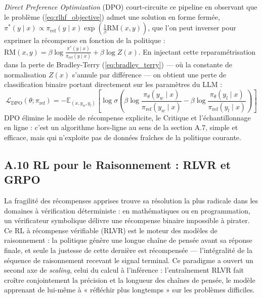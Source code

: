 \documentclass[11pt,a4paper]{article}
\begin{document}
\emph{Direct Preference Optimization} (DPO) \cite{rafailov2024direct} court-circuite ce pipeline en observant que le problème (\ref{eq:rlhf_objective}) admet une solution en forme fermée, $\pi^*(y \mid x) \propto \pi_{\text{ref}}(y \mid x) \exp(\frac{1}{\beta}\text{RM}(x,y))$, que l'on peut inverser pour exprimer la récompense en fonction de la politique : $\text{RM}(x, y) = \beta \log \frac{\pi^*(y \mid x)}{\pi_{\text{ref}}(y \mid x)} + \beta \log Z(x)$. En injectant cette reparamétrisation dans la perte de Bradley-Terry (\ref{eq:bradley_terry}) — où la constante de normalisation $Z(x)$ s'annule par différence — on obtient une perte de classification binaire portant directement sur les paramètres du LLM :
\begin{equation}
\mathcal{L}_{\text{DPO}}(\theta; \pi_{\text{ref}}) = -\mathbb{E}_{(x, y_w, y_l)} \left[ \log \sigma \left( \beta \log \frac{\pi_\theta(y_w \mid x)}{\pi_{\text{ref}}(y_w \mid x)} - \beta \log \frac{\pi_\theta(y_l \mid x)}{\pi_{\text{ref}}(y_l \mid x)} \right) \right]
\end{equation}
DPO élimine le modèle de récompense explicite, le Critique et l'échantillonnage en ligne : c'est un algorithme hors-ligne au sens de la section A.7, simple et efficace, mais qui n'exploite pas de données fraîches de la politique courante.

\subsection*{A.10 RL pour le Raisonnement : RLVR et GRPO}
La fragilité des récompenses apprises trouve sa résolution la plus radicale dans les domaines à vérification déterministe : en mathématiques ou en programmation, un vérificateur symbolique délivre une récompense binaire impossible à pirater. Ce RL à récompense vérifiable (RLVR) est le moteur des modèles de raisonnement : la politique génère une longue chaîne de pensée avant sa réponse finale, et seule la justesse de cette dernière est récompensée — l'intégralité de la séquence de raisonnement recevant le signal terminal. Ce paradigme a ouvert un second axe de \emph{scaling}, celui du calcul à l'inférence : l'entraînement RLVR fait croître conjointement la précision et la longueur des chaînes de pensée, le modèle apprenant de lui-même à « réfléchir plus longtemps » sur les problèmes difficiles.
\end{document}
